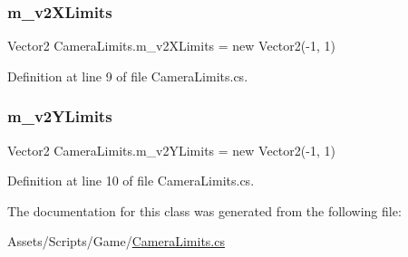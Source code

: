 \subsubsection{\texorpdfstring{m\+\_\+v2\+X\+Limits}{m\_v2XLimits}}
{\footnotesize\ttfamily Vector2 Camera\+Limits.\+m\+\_\+v2\+X\+Limits = new Vector2(-\/1, 1)}



Definition at line 9 of file Camera\+Limits.\+cs.

\mbox{\label{class_camera_limits_a417ee3a501b841675c99d69b36029e3d}} 
\subsubsection{\texorpdfstring{m\+\_\+v2\+Y\+Limits}{m\_v2YLimits}}
{\footnotesize\ttfamily Vector2 Camera\+Limits.\+m\+\_\+v2\+Y\+Limits = new Vector2(-\/1, 1)}



Definition at line 10 of file Camera\+Limits.\+cs.



The documentation for this class was generated from the following file\+:\begin{DoxyCompactItemize}
\item 
Assets/\+Scripts/\+Game/\mbox{\hyperlink{_camera_limits_8cs}{Camera\+Limits.\+cs}}\end{DoxyCompactItemize}
